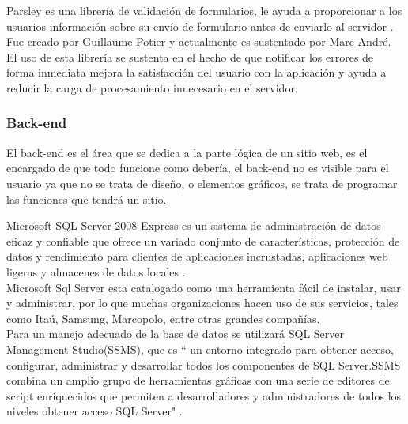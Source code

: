 
 Parsley es una librería de validación de formularios, le ayuda a proporcionar a los usuarios información sobre su envío de formulario antes de enviarlo al servidor \cite{PAR15}. Fue creado por Guillaume Potier y actualmente es sustentado por Marc-André. 
\\

El uso de esta librería se sustenta en el hecho de que notificar los errores de forma inmediata  mejora la satisfacción del usuario con la aplicación y ayuda a reducir la carga de procesamiento innecesario en el servidor.

\subsubsection{Back-end}

El back-end es el área que se dedica a la parte lógica de un sitio web, es el encargado de que todo funcione como debería, el back-end no es visible para el usuario ya que no se trata de diseño, o elementos gráficos, se trata de programar las funciones que tendrá un sitio.


Microsoft SQL Server 2008 Express es un sistema de administración de datos eficaz y confiable que ofrece un variado conjunto de características, protección de datos y rendimiento para clientes de aplicaciones incrustadas, aplicaciones web ligeras y almacenes de datos locales \cite{mic15b}.
\\



Microsoft Sql Server  esta catalogado como  una herramienta fácil de instalar, usar y administrar, por lo que muchas organizaciones hacen uso de sus servicios, tales como  Itaú, Samsung, Marcopolo, entre otras grandes compañías.
\\


Para un manejo adecuado de la base de datos se utilizará SQL Server Management Studio(SSMS), que es `` un entorno integrado para obtener acceso, configurar, administrar y desarrollar todos los componentes de SQL Server.SSMS combina un amplio grupo de herramientas gráficas con una serie de editores de script enriquecidos que permiten a desarrolladores y administradores de todos los niveles obtener acceso SQL Server" \cite{mic15c}.







